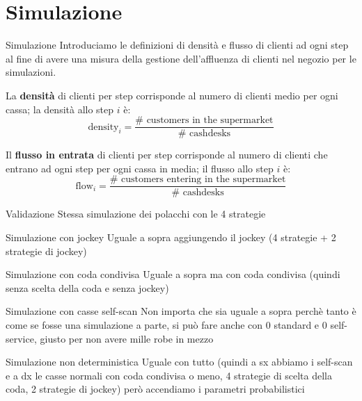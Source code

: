 \section{Simulazione}
\begin{frame}{Simulazione}
	Introduciamo le definizioni di densità e flusso di clienti ad ogni step al fine di avere una misura della gestione dell'affluenza di clienti nel negozio per le simulazioni.
	
	La \textbf{densità} di clienti per step corrisponde al numero di clienti medio per ogni cassa; la densità allo step $i$ è:
	\[\text{density}_i = \frac{\# \text{ customers in the supermarket}}{\# \text{ cashdesks}}\]
	
	Il \textbf{flusso in entrata} di clienti per step corrisponde al numero di clienti che entrano ad ogni step per ogni cassa in media; il flusso allo step $i$ è:
	\[\text{flow}_i = \frac{\# \text{ customers entering in the supermarket}}{\# \text{ cashdesks}}\]
\end{frame}

\begin{frame}{Validazione}
	\centering
	Stessa simulazione dei polacchi con le 4 strategie
\end{frame}

\begin{frame}{Simulazione con jockey}
	\centering
	Uguale a sopra aggiungendo il jockey (4 strategie + 2 strategie di jockey)
\end{frame}

\begin{frame}{Simulazione con coda condivisa}
	\centering
	Uguale a sopra ma con coda condivisa (quindi senza scelta della coda e senza jockey)
\end{frame}

\begin{frame}{Simulazione con casse self-scan}
	\centering
	Non importa che sia uguale a sopra perchè tanto è come se fosse una simulazione a parte, si può fare anche con 0 standard e 0 self-service, giusto per non avere mille robe in mezzo
\end{frame}

\begin{frame}{Simulazione non deterministica}
	\centering
	Uguale con tutto (quindi a sx abbiamo i self-scan e a dx le casse normali con coda condivisa o meno, 4 strategie di scelta della coda, 2 strategie di jockey) però accendiamo i parametri probabilistici 
\end{frame}